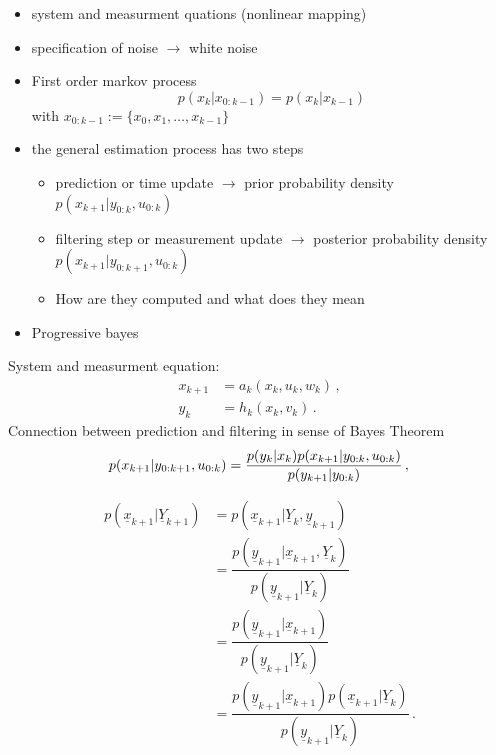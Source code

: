 \documentclass[a4paper]{IEEEtran}
\begin{document}
\begin{itemize}
    \item system and measurment quations (nonlinear mapping)
    \item specification of noise $\rightarrow$ white noise 
    \item First order markov process $$p(x_{k} \vert x_{0:k-1}) = p(x_{k} \vert x_{k-1})$$
    with $x_{0:k-1} := \{x_{0}, x_{1}, \dots, x_{k-1}\}$ 
    \item the general estimation process has two steps
    \begin{itemize}
        \item prediction or time update $\rightarrow$ prior probability density $p(x_{k+1} \vert y_{0:k}, u_{0:k})$
        \item filtering step or measurement update $\rightarrow$ posterior probability density $p(x_{k+1} \vert y_{0:k+1}, u_{0:k})$
        \item How are they computed and what does they mean
    \end{itemize}
    \item Progressive bayes
\end{itemize}
System and measurment equation:
\begin{equation}
    \begin{split}
        x_{k+1}  &= a_{k}(x_{k}, u_{k}, w_{k}) \,, \\
        y_{k}    &= h_{k}(x_{k}, v_{k}) \,.
    \end{split}
\end{equation}
Connection between prediction and filtering in sense of Bayes Theorem
\begin{equation}
    p(x_{k+1} \vert y_{0:k+1}, u_{0:k}) =  \frac{p(y_{k} \vert x_{k})p(x_{k+1} \vert y_{0:k}, u_{0:k})}{p(y_{k+1} \vert y_{0:k})}\,, \\
\end{equation}

\begin{equation}
    \begin{split}
        p(\underline{x}_{k+1} \vert \underline{Y}_{k+1}) &= p(\underline{x}_{k+1} \vert \underline{Y}_{k}, \underline{y}_{k+1}) \\
        &= \dfrac{p(\underline{y}_{k+1} \vert \underline{x}_{k+1}, \underline{Y}_{k})}{p(\underline{y}_{k+1} \vert \underline{Y}_{k})} \\
        &= \dfrac{p(\underline{y}_{k+1} \vert \underline{x}_{k+1})}{p(\underline{y}_{k+1} \vert \underline{Y}_{k})} \\
        &= \dfrac{p(\underline{y}_{k+1} \vert \underline{x}_{k+1}) p(\underline{x}_{k+1} \vert \underline{Y}_{k})}{p(\underline{y}_{k+1} \vert \underline{Y}_{k})} \,.  
        \label{eq:posterior_gen_density}
    \end{split}
\end{equation}
\end{document}
